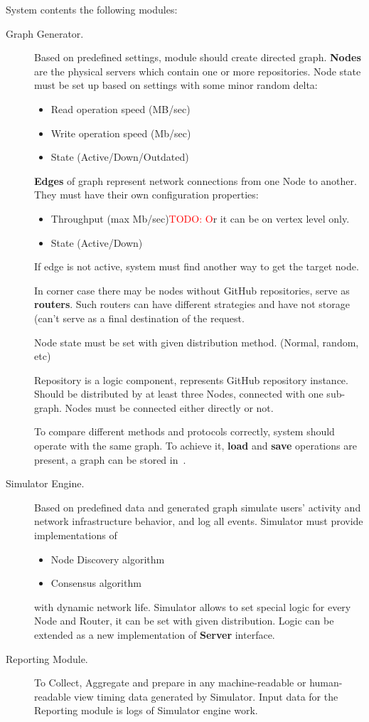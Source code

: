 \documentclass[12pt,oneside]{article}
\newcommand{\todo}[1]{\textcolor{red}{TODO: #1}}
\begin{document}
System contents the following modules:
\begin{description}
    \item[Graph Generator.]
    Based on predefined settings, module should create directed graph. \textbf{Nodes} are the physical servers which contain one or more repositories. Node state must be set up based on settings with some minor random delta:
    \begin{itemize}
        \item Read operation speed (MB/sec)
        \item Write operation speed (Mb/sec)
        \item State (Active/Down/Outdated)
    \end{itemize}
    \textbf{Edges} of graph represent network connections from one Node to another. They must have their own configuration properties:
    \begin{itemize}
        \item Throughput (max Mb/sec)\todo Or it can be on vertex level only.
        \item State (Active/Down)
    \end{itemize}
    If edge is not active, system must find another way to get the target node.\par
    In corner case there may be nodes without GitHub repositories, serve as \textbf{routers}. Such routers can have different strategies and have not storage (can't serve as a final destination of the request.\par
    Node state must be set with given distribution method. (Normal, random, etc)\par
    Repository is a logic component, represents GitHub repository instance. Should be distributed by at least three Nodes, connected with one sub-graph. Nodes must be connected either directly or not.\par

    To compare different methods and protocols correctly, system should operate with the same graph. To achieve it, \textbf{load} and \textbf{save} operations are present, a graph can be stored in~\cite{dot}.


    \item[Simulator Engine.]
    Based on predefined data and generated graph simulate users' activity and network infrastructure behavior, and log all events. Simulator must provide implementations of
    \begin{itemize}
        \item Node Discovery algorithm
        \item Consensus algorithm
    \end{itemize}
    with dynamic network life.
    Simulator allows to set special logic for every Node and Router, it can be set with given distribution.
    Logic can be extended as a new implementation of \textbf{Server} interface.

    \item[Reporting Module.]
    To Collect, Aggregate and prepare in any machine-readable or human-readable view timing data generated by Simulator. Input data for the Reporting module is logs of Simulator engine work.

\end{description}

\printbibliography%
\end{document}
